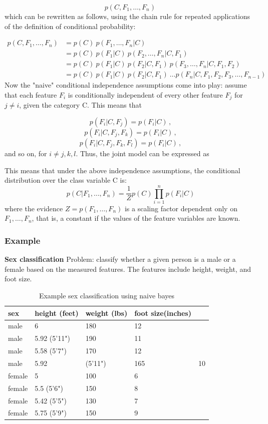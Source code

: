 \documentclass[12pt]{book}
\begin{document}
$$ p(C, F_1, \dots, F_n)\, $$
which can be rewritten as follows, using the chain rule for repeated applications of the definition of conditional probability:

\begin{align}
p(C, F_1, \dots, F_n) & = p(C) \ p(F_1,\dots,F_n\vert C) \\
                      & = p(C) \ p(F_1\vert C) \ p(F_2,\dots,F_n\vert C, F_1) \\
                      & = p(C) \ p(F_1\vert C) \ p(F_2\vert C, F_1) \ p(F_3,\dots,F_n\vert C, F_1, F_2) \\
                      & = p(C) \ p(F_1\vert C) \ p(F_2\vert C, F_1) \ \dots p(F_n\vert C, F_1, F_2, F_3,\dots,F_{n-1}) 
\end{align}
Now the "naive" conditional independence assumptions come into play: assume that each feature $F_i$ is conditionally independent of every other feature $F_j$ for $j\neq i$, given the category C. This means that

$$ p(F_i \vert C, F_j) = p(F_i \vert C)\,, $$
$$ p(F_i \vert C, F_j,F_k) = p(F_i \vert C)\,, $$
$$ p(F_i \vert C, F_j,F_k,F_l) = p(F_i \vert C)\,, $$
and so on, for  $i\ne j,k,l$. Thus, the joint model can be expressed as

This means that under the above independence assumptions, the conditional distribution over the class variable C is:
$$ p(C \vert F_1,\dots,F_n) = \frac{1}{Z}  p(C) \prod_{i=1}^n p(F_i \vert C)$$
where the evidence $Z = p(F_1, \dots, F_n)$ is a scaling factor dependent only on $F_1,\dots,F_n$, that is, a constant if the values of the feature variables are known.


\subsubsection{Example}

\textbf{Sex classification}
Problem: classify whether a given person is a male or a female based on the measured features. The features include height, weight, and foot size.

\begin{longtable}[c]{ |p{3cm}|p{3cm}|p{3cm}|p{3cm}|  }
  \caption{Example sex classification using naive bayes\label{tab:sex_classification_naive_bayes}}\\
  \hline
  sex & height (feet) & weight (lbs) & foot size(inches)\\
  \hline
  \endhead
  male & 6 & 180 & 12\\
  \hline
  male & 5.92 (5'11") & 190 & 11\\
  \hline
  male & 5.58 (5'7") & 170 & 12\\
  \hline
  male & 5.92 & (5'11") & 165 & 10\\
  \hline
  female & 5 & 100 & 6\\
  \hline
  female & 5.5 (5'6") & 150 & 8\\
  \hline
  female & 5.42 (5'5") & 130 & 7\\
  \hline
  female & 5.75 (5'9") & 150 & 9\\
  \hline
\end{longtable}
\end{document}
